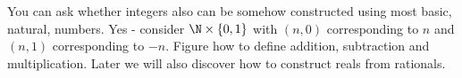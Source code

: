 You can ask whether integers also can be somehow constructed using most basic, natural, numbers. Yes - consider $\N\times \{0,1\}$ with $(n,0)$ corresponding to $n$
and $(n,1)$ corresponding to $-n$. Figure how to define addition, subtraction and multiplication. Later we will also discover how to construct reals from rationals.
